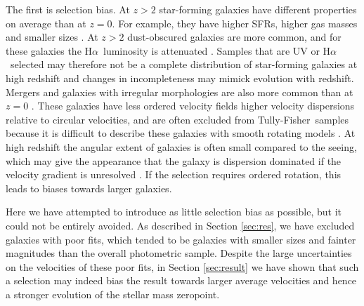 \documentclass{emulateapj}
\newcommand{\ha}{H$\alpha$}
\newcommand{\tf}{Tully-Fisher}
\begin{document}
{The first is selection bias. At $z>2$ star-forming galaxies have different properties on average than at $z=0$. For example, they have higher SFRs, higher gas masses and smaller sizes \citep[e.g.][]{Papovich14,vanderWel14a}. At $z>2$ dust-obscured galaxies are more common, and for these galaxies the \ha\ luminosity is attenuated \citep[e.g.][]{Reddy05,Spitler14}. Samples that are UV or \ha\ selected may therefore not be a complete distribution of star-forming galaxies at high redshift and changes in incompleteness may mimick evolution with redshift. Mergers and galaxies with irregular morphologies are also more common than at $z=0$ \citep[e.g.][]{Abraham01,Mortlock13}. These galaxies have less ordered velocity fields \citep[e.g.][]{Kassin07} higher velocity dispersions relative to circular velocities, and are often excluded from \tf\ samples because it is difficult to describe these galaxies with smooth rotating models \citep{Cresci09,Gnerucci11}. At high redshift the angular extent of galaxies is often small compared to the seeing, which may give the appearance that the galaxy is dispersion dominated if the velocity gradient is unresolved \citep[e.g.][]{Miller12}. If the selection requires ordered rotation, this leads to biases towards larger galaxies.

Here we have attempted to introduce as little selection bias as possible, but it could not be entirely avoided. As {described} in Section \ref{sec:res}, we have excluded galaxies with poor fits, which tended to be galaxies with smaller sizes and fainter magnitudes than the overall photometric sample. {Despite the large uncertainties on the velocities of these poor fits, in Section \ref{sec:result} we have shown that such a selection may indeed bias the result towards larger average velocities and hence a stronger evolution of the stellar mass zeropoint.} 

}
\end{document}
